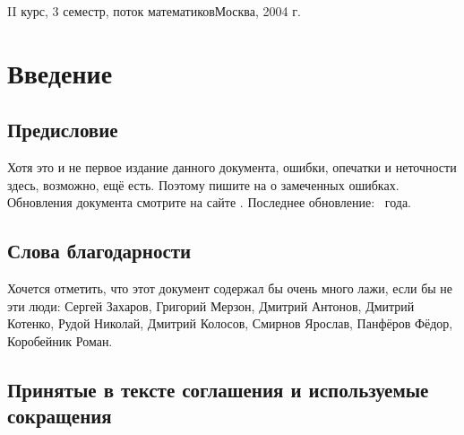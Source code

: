 \documentclass[a4paper]{article}
\begin{document}
{II курс, 3 семестр, поток математиков}{Москва, 2004 г.}

\pagebreak
\tableofcontents
\pagebreak

\section*{Введение}

\subsection*{Предисловие}
Хотя это и не первое издание данного документа, ошибки, опечатки и неточности здесь, возможно, ещё
есть. Поэтому пишите на \dmvnmail{} о замеченных ошибках. Обновления документа
смотрите на сайте \dmvnwebsite{}. Последнее обновление: ~года.

\subsection*{Слова благодарности}

Хочется отметить, что этот документ содержал бы очень много лажи,
если бы не эти люди: Сергей Захаров, Григорий Мерзон, Дмитрий Антонов, Дмитрий Котенко, Рудой Николай,
Дмитрий Колосов, Смирнов Ярослав, Панфёров Фёдор, Коробейник Роман.

\subsection*{Принятые в тексте соглашения и используемые сокращения}
\end{document}
